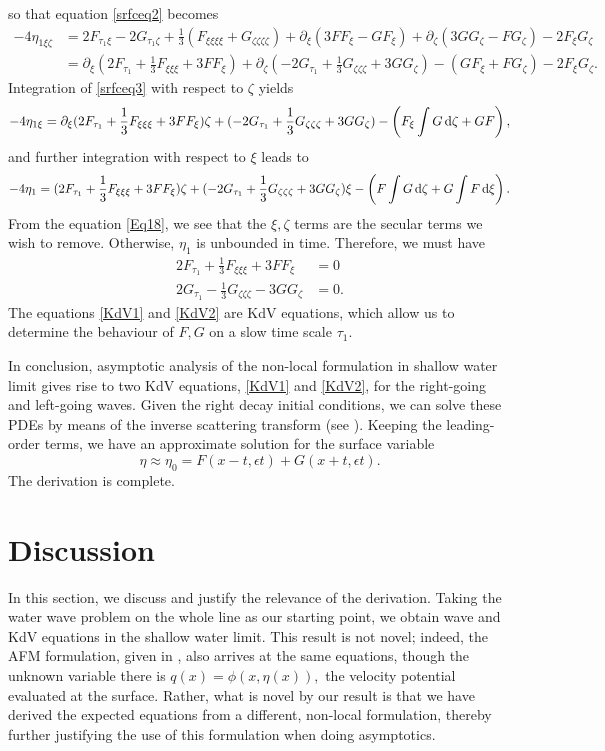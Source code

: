 \documentclass[11pt,reqno,oneside,a4paper]{article}
\begin{document}
so that equation \eqref{srfceq2} becomes
\begin{align}
- 4\eta_{1\xi \zeta} &= 2F_{\tau_1 \xi} - 2G_{\tau_1 \zeta} + \frac{1}{3}(F_{\xi\xi\xi\xi} + G_{\zeta\zeta\zeta\zeta}) + \partial_\xi(3 F F_\xi - G F_\xi) + \partial_\zeta(3 G G_\zeta - F G_\zeta) - 2 F_\xi G_\zeta \nonumber \\
&= \partial_\xi(2F_{\tau_1} + \frac{1}{3}F_{\xi\xi\xi} + 3 F F_\xi) + \partial_\zeta(- 2G_{\tau_1} +  \frac{1}{3}G_{\zeta\zeta\zeta} + 3 G G_\zeta) - (G F_\xi  + F G_\zeta) - 2 F_\xi G_\zeta. \label{srfceq3}
\end{align}
Integration of \eqref{srfceq3} with respect to $\zeta$ yields
\[ 
- 4\eta_{1\xi} = \partial_\xi(2F_{\tau_1} + \frac{1}{3}F_{\xi\xi\xi} + 3 F F_\xi) \zeta + (- 2G_{\tau_1} +  \frac{1}{3}G_{\zeta\zeta\zeta} + 3 G G_\zeta) - \left(F_\xi \int G \,\mathrm{d} \zeta   + G F\right),
\]
and further integration with respect to $\xi$ leads to
\begin{equation}\label{Eq18}
- 4\eta_{1} = (2F_{\tau_1} + \frac{1}{3}F_{\xi\xi\xi} + 3 F F_\xi) \zeta + (- 2G_{\tau_1} +  \frac{1}{3}G_{\zeta\zeta\zeta}+ 3 G G_\zeta) \xi - \left(F \int G \,\mathrm{d} \zeta  + G \int F \,\mathrm{d} \xi \right).
\end{equation}
From the equation \eqref{Eq18}, we see that the $\xi, \zeta$ terms are the secular terms we wish to remove. Otherwise, $\eta_1$ is unbounded in time. Therefore, we must have 
\begin{align}
2F_{\tau_1} + \frac{1}{3}F_{\xi\xi\xi} + 3 F F_\xi &= 0 \label{KdV1} \\
2G_{\tau_1} - \frac{1}{3}G_{\zeta\zeta\zeta} -  3 G G_\zeta &= 0. \label{KdV2}
\end{align}
The equations \eqref{KdV1} and \eqref{KdV2} are KdV equations, which allow us to determine the behaviour of $F, G$ on a slow time scale $\tau_1.$ 

In conclusion, asymptotic analysis of the non-local formulation in shallow water limit gives rise to two KdV equations, \eqref{KdV1} and \eqref{KdV2}, for the right-going and left-going waves. Given the right decay initial conditions, we can solve these PDEs by means of the inverse scattering transform (see \cite[Chapter 9]{Ablowitz}). Keeping the leading-order terms, we have an approximate solution for the surface variable
\[ \eta \approx \eta_0 = F(x- t, \epsilon t) + G(x + t, \epsilon t).\]
The derivation is complete.

\section{Discussion}
In this section, we discuss and justify the relevance of the derivation. Taking the water wave problem on the whole line as our starting point, we obtain wave and KdV equations in the shallow water limit. This result is not novel; indeed, the AFM formulation, given in \cite{AFM2006}, also arrives at the same equations, though the unknown variable there is $q(x) = \phi(x,\eta(x)),$ the velocity potential evaluated at the surface. Rather, what is novel by our result is that we have derived the expected equations from a different, non-local formulation, thereby further justifying the use of this formulation when doing asymptotics. 
\end{document}
